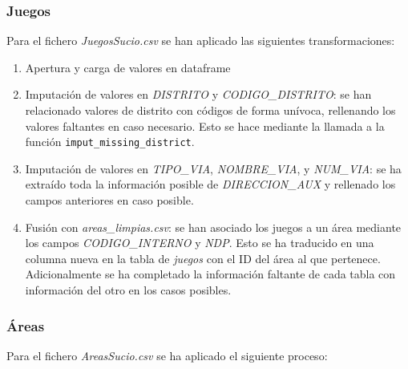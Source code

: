 \documentclass[]{article}
\begin{document}
\subsubsection{Juegos}
\label{subsubsec:preprocessjuego}
Para el fichero \textit{JuegosSucio.csv} se han aplicado las siguientes transformaciones:

\begin{enumerate}
    \item Apertura y carga de valores en dataframe
    \item Imputación de valores en \textit{DISTRITO} y \textit{CODIGO\_DISTRITO}: se han relacionado valores de distrito con códigos de forma unívoca, rellenando los valores faltantes en caso necesario. Esto se hace mediante la llamada a la función \texttt{imput\_missing\_district}.
    \item Imputación de valores en \textit{TIPO\_VIA}, \textit{NOMBRE\_VIA}, y \textit{NUM\_VIA}: se ha extraído toda la información posible de \textit{DIRECCION\_AUX} y rellenado los campos anteriores en caso posible.
    \item Fusión con \textit{areas\_limpias.csv}: se han asociado los juegos a un área mediante los campos \textit{CODIGO\_INTERNO} y \textit{NDP}. Esto se ha traducido en una columna nueva en la tabla de \textit{juegos} con el ID del área al que pertenece. Adicionalmente se ha completado la información faltante de cada tabla con información del otro en los casos posibles.
\end{enumerate}

\subsubsection{Áreas}
\label{subsubsec:preprocessarea}
Para el fichero \textit{AreasSucio.csv} se ha aplicado el siguiente proceso:
\end{document}
